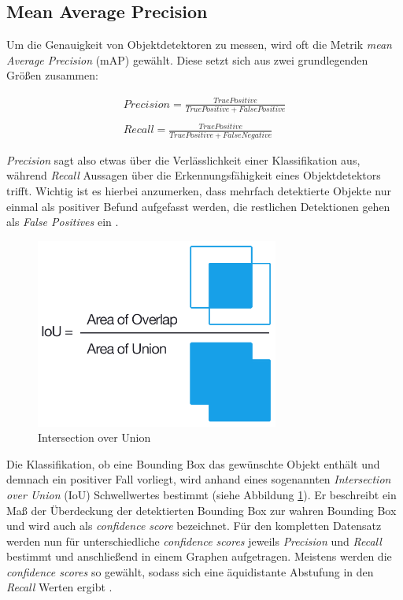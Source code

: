 \subsection*{Mean Average Precision}

Um die Genauigkeit von Objektdetektoren zu messen, wird oft die Metrik \textit{mean Average Precision} (mAP) gewählt. Diese setzt sich aus zwei grundlegenden Größen zusammen:

\begin{equation} \label{precisionandrecall}
\begin{split}
Precision = \frac{True Positive}{True Positive + False Positive} \\
\\
Recall = \frac{True Positive}{True Positive + False Negative}
\end{split}
\end{equation}

\textit{Precision} sagt also etwas über die Verlässlichkeit einer Klassifikation aus, während \textit{Recall} Aussagen über die Erkennungsfähigkeit eines Objektdetektors trifft. Wichtig ist es hierbei anzumerken, dass mehrfach detektierte Objekte nur einmal als positiver Befund aufgefasst werden, die restlichen Detektionen gehen als \textit{False Positives} ein \cite{PaulHenderson.2017}.

\begin{figure}[ht]
	\begin{center}
		\includegraphics[width=8cm]{Bilder/iou_equation.png} 
		\caption[Intersection over Union]{Intersection over Union \cite{AdrianRosebrock.20161107}}
		\label{iou}
	\end{center}
\end{figure}

Die Klassifikation, ob eine Bounding Box das gewünschte Objekt enthält und demnach ein positiver Fall vorliegt, wird anhand eines sogenannten \textit{Intersection over Union} (IoU) Schwellwertes bestimmt (siehe Abbildung \ref{iou}). Er beschreibt ein Maß der Überdeckung der detektierten Bounding Box zur wahren Bounding Box und wird auch als \textit{confidence score} bezeichnet. Für den kompletten Datensatz werden nun für unterschiedliche \textit{confidence scores} jeweils \textit{Precision} und \textit{Recall} bestimmt und anschließend in einem Graphen aufgetragen. Meistens werden die \textit{confidence scores} so gewählt, sodass sich eine äquidistante Abstufung in den \textit{Recall} Werten ergibt \cite{DingfuZhouJinFangXibinSongChenyeGuanJunboYinYuchaoDaiRuigangYang.2019}. 

